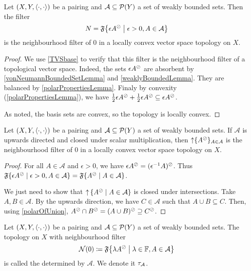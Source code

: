 \begin{proposition}
Let $\sSet{X,Y,\pair{\cdot,\cdot}}$ be a pairing and $\mathcal{A}\subseteq\operatorname{\mathcal{P}}(Y)$ a set of weakly bounded sets. Then the filter
\[ N = \mathfrak{F}\setbuilder{\epsilon A^\pol}{\epsilon>0, A\in \mathcal{A}} \]
is the neighbourhood filter of $0$ in a locally convex vector space topology on $X$.
\end{proposition}
\begin{proof}
We use \ref{TVSbase} to verify that this filter is the neighbourhood filter of a topological vector space. Indeed, the sets $\epsilon A^\oslash$ are absorbent by \ref{vonNeumannBoundedSetLemma} and \ref{weaklyBoundedLemma}. They are balanced by \ref{polarPropertiesLemma}. Finaly by convexity (\ref{polarPropertiesLemma}), we have $\frac{1}{2}\epsilon A^\oslash + \frac{1}{2} \epsilon A^\oslash \subseteq \epsilon A^\oslash$.

As noted, the basis sets are convex, so the topology is locally convex.
\end{proof}
\begin{corollary}
Let $\sSet{X,Y,\pair{\cdot,\cdot}}$ be a pairing and $\mathcal{A}\subseteq\operatorname{\mathcal{P}}(Y)$ a set of weakly bounded sets.
If $\mathcal{A}$ is upwards directed and closed under scalar multiplication, then $\operatorname{\uparrow}\{A^\oslash\}_{A\in \mathcal{A}}$ is the neighbourhood filter of $0$ in a locally convex vector space topology on $X$.
\end{corollary}
\begin{proof}
For all $A\in \mathcal{A}$ and $\epsilon>0$, we have $\epsilon A^\oslash = (\epsilon^{-1}A)^\oslash$. Thus $\mathfrak{F}\setbuilder{\epsilon A^\pol}{\epsilon>0, A\in \mathcal{A}} = \mathfrak{F}\setbuilder{A^\pol}{A\in \mathcal{A}}$.

We just need to show that $\upset\setbuilder{A^\pol}{A\in \mathcal{A}}$ is closed under intersections. Take $A,B\in \mathcal{A}$. By the upwards direction, we have $C\in \mathcal{A}$ such that $A\cup B \subseteq C$.
Then, using \ref{polarOfUnion}, $A^\oslash\cap B^\oslash = (A\cup B)^\oslash \supseteq C^\oslash$.
\end{proof}

\begin{definition}
Let $\sSet{X,Y,\pair{\cdot,\cdot}}$ be a pairing and $\mathcal{A}\subseteq\operatorname{\mathcal{P}}(Y)$ a set of weakly bounded sets. The topology on $X$ with neighbourhood filter
\[ \neighbourhood(0) \defeq \mathfrak{F}\setbuilder{\lambda A^\pol}{\lambda\in \F, A\in \mathcal{A}} \]
is called the  determined by $\mathcal{A}$. We denote it $\tau_{\mathcal{A}}$.
\end{definition}

